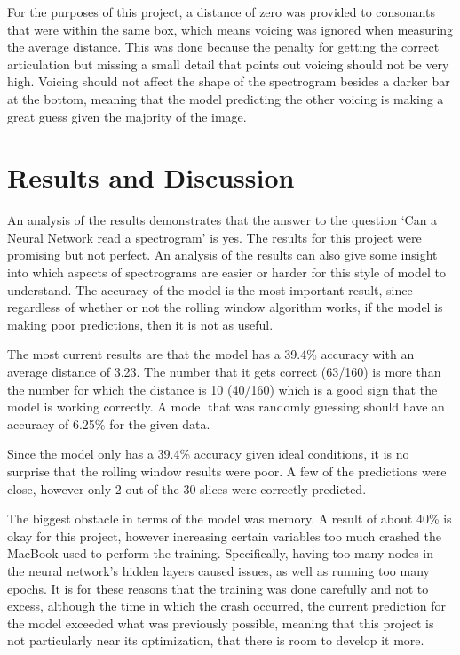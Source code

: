 \documentclass[10pt,twocolumn]{article}
\begin{document}
For the purposes of this project, a distance of zero was provided to consonants that were within the same box, which means voicing was ignored when measuring the average distance. This was done because the penalty for getting the correct articulation but missing a small detail that points out voicing should not be very high. Voicing should not affect the shape of the spectrogram besides a darker bar at the bottom, meaning that the model predicting the other voicing is making a great guess given the majority of the image.

\section{Results and Discussion}

An analysis of the results demonstrates that the answer to the question ‘Can a Neural Network read a spectrogram’ is yes. The results for this project were promising but not perfect. An analysis of the results can also give some insight into which aspects of spectrograms are easier or harder for this style of model to understand. The accuracy of the model is the most important result, since regardless of whether or not the rolling window algorithm works, if the model is making poor predictions, then it is not as useful. 

The most current results are that the model has a 39.4\% accuracy with an average distance of 3.23. The number that it gets correct (63/160) is more than the number for which the distance is 10 (40/160) which is a good sign that the model is working correctly. A model that was randomly guessing should have an accuracy of 6.25\% for the given data. 

Since the model only has a 39.4\% accuracy given ideal conditions, it is no surprise that the rolling window results were poor. A few of the predictions were close, however only 2 out of the 30 slices were correctly predicted. 


The biggest obstacle in terms of the model was memory. A result of about 40\% is okay for this project, however increasing certain variables too much crashed the MacBook used to perform the training. Specifically, having too many nodes in the neural network’s hidden layers caused issues, as well as running too many epochs. It is for these reasons that the training was done carefully and not to excess, although the time in which the crash occurred, the current prediction for the model exceeded what was previously possible, meaning that this project is not particularly near its optimization, that there is room to develop it more.
\end{document}
